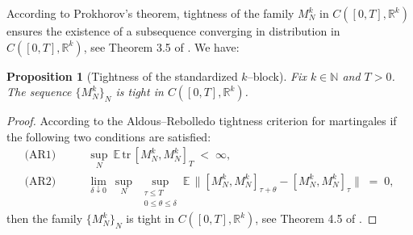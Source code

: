 \documentclass[12pt,reqno]{amsart}
\theoremstyle{plain}
\newtheorem{prop}{Proposition}[section]
\theoremstyle{definition}
\theoremstyle{remark}
\begin{document}
According to Prokhorov's theorem, tightness of the family $M_N^k$ in $C([0,T],\mathbb{R}^k)$ ensures the existence of a subsequence converging in distribution in $C([0,T],\mathbb{R}^k)$, see Theorem 3.5 of \cite{JS}. We have:

\begin{prop}[Tightness of the standardized $k$–block]
\label{prop:tight-MNk}
Fix $k\in\mathbb{N}$ and $T>0$. The sequence $\{M_N^k\}_N$ is tight in
$C([0,T],\mathbb{R}^{k})$.
\end{prop}


\begin{proof} According to the Aldous–Rebolledo tightness criterion for martingales 
if the following two conditions are satisfied:
\begin{align}
\text{(AR1)}\qquad &\sup_{N}\ \mathbb{E}\,\mathrm{tr}\,[ M^k_N,  M^k_N ]_T \;<\;\infty,
\label{eq:AR1}\\
\text{(AR2)}\qquad &\lim_{\delta\downarrow 0}\ \sup_{N}\ \sup_{\substack{\tau\le T\\ 0\le \theta\le \delta}}
\mathbb{E}\,\big\|[ M_N^k ,M^k_N]_{\tau+\theta}-[ M^k_N,M^k_N ]_{\tau}\big\|\;=\;0,
\label{eq:AR2}
\end{align} 
then the family $\{M_N^k \}_N$ is tight in
$C([0,T],\mathbb{R}^k)$, see Theorem 4.5 of \cite{JS}. 


\end{proof}
\end{document}
